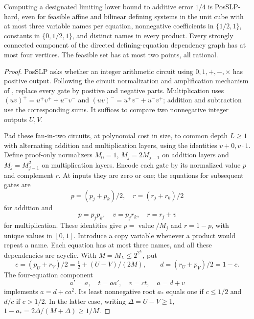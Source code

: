 \begin{proposition}\label{prop:fbbt-hardness}
Computing a designated limiting lower bound to additive error $1/4$ is
PosSLP-hard, even for feasible affine and bilinear defining systems in
the unit cube with at most three variable names per equation,
nonnegative coefficients in $\{1/2,1\}$, constants in $\{0,1/2,1\}$,
and distinct names in every product. Every strongly connected component
of the directed defining-equation dependency graph has at most four
vertices. The feasible set has at most two points, all rational.
\end{proposition}
\begin{proof}
PosSLP asks whether an integer arithmetic circuit using $0,1,+,-,\times$
has positive output. Following the circuit normalization and amplification
mechanism of \citet[Theorem 5.2]{EtessamiYannakakis2009}, replace every
gate by positive and negative parts. Multiplication uses
$(uv)^+=u^+v^++u^-v^-$ and $(uv)^-=u^+v^-+u^-v^+$; addition and
subtraction use the corresponding sums. It suffices to compare two
nonnegative integer outputs $U,V$.

Pad these fan-in-two circuits, at polynomial cost in size, to common
depth $L\ge1$ with alternating addition and multiplication layers, using
the identities $v+0,v\cdot1$. Define proof-only normalizers $M_0=1$,
$M_j=2M_{j-1}$ on addition layers and $M_j=M_{j-1}^2$ on multiplication
layers. Encode each gate by its normalized value $p$ and complement $r$.
At inputs they are zero or one; the equations for subsequent gates are
\[
 p=(p_j+p_k)/2,\quad r=(r_j+r_k)/2
\]
for addition and
\[
 p=p_jp_k,\quad v=p_jr_k,\quad r=r_j+v
\]
for multiplication. These identities give $p=\operatorname{value}/M_j$
and $r=1-p$, with unique values in $[0,1]$. Introduce a copy variable
whenever a product would repeat a name. Each equation has at most three
names, and all these dependencies are acyclic. With $M=M_L\le2^{2^L}$,
put
\[
 c=(p_U+r_V)/2=\tfrac12+(U-V)/(2M),\qquad
 d=(r_U+p_V)/2=1-c.
\]
The four-equation component
\[
 a'=a,\quad t=aa',\quad v=ct,\quad a=d+v
\]
implements $a=d+ca^2$. Its least nonnegative root $a_*$ equals one if
$c\le1/2$ and $d/c$ if $c>1/2$. In the latter case, writing
$\Delta=U-V\ge1$,
$1-a_*=2\Delta/(M+\Delta)\ge1/M$.


\end{proof}
